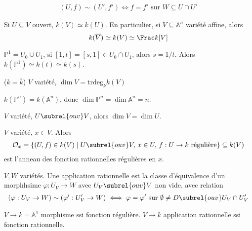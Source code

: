        \begin{align*}
            (U,f) \sim (U', f') \iff f = f' \text{ sur } W \subseteq U \cap U'
        \end{align*}
        \begin{remq}
            Si $U \subseteq V$ ouvert, $k(V) \simeq k(U)$. En particulier, si $V \subseteq  \mathbb{A}^n$ variété affine, alors
            \begin{align*}
                k(\overline{V}) \simeq k(V) \simeq \Frac k[V]
            \end{align*}
        \end{remq}
        \begin{expl}
            $\mathbb{P}^1 = U_0 \cup U_1$, si $[1,t] = [s,1] \in U_0 \cap U_1$, alors $s = 1/t$. Alors $k(\mathbb{P}^1) \simeq k(t) \simeq k(s)$.
        \end{expl}
        \begin{defi} ($k = \bar k$)
            $V$ variété, $\dim V = \mathrm{trdeg}_kk(V)$
        \end{defi}
        \begin{expl}
            $k(\mathbb{P}^n) = k(\mathbb{A}^n)$, donc $\dim \mathbb{P}^n = \dim \mathbb{A}^n = n$.
        \end{expl}
        \begin{remq}
            $V$ variété, $U \subrel{ouv} V$, alors $\dim V = \dim U$.
        \end{remq}
        \begin{defi}
            $V$ variété, $x \in V$. Alors
            \begin{align*}
                \mathcal{O}_x = \{(U, f) \in k(V) \mid U \subrel{ouv} V,\, x \in U,\, f : U \to k \text{ régulière}\} \subseteq k(V)
            \end{align*}
            est l'anneau des fonction rationnelles régulières en $x$.
        \end{defi}
        \begin{defi}
            $V,W$ variétés. Une application rationnelle est la classe d'équivalence d'un morphhsime $\varphi : U_V \to W$ avec $U_V \subrel{ouv} V$ non vide, avec relation 
            \begin{align*}
                (\varphi : U_V \to W) \sim (\varphi' : U_V' \to W) \iff \varphi = \varphi' \text{ sur } \emptyset \neq D \subrel{ouv} U_V \cap U_V'
            \end{align*}
        \end{defi}
        \begin{expl}
            $V \to k = \mathbb{A}^1$ morphisme ssi fonction régulière. $V \to k$ application rationnelle ssi fonction rationnelle.
        \end{expl}
